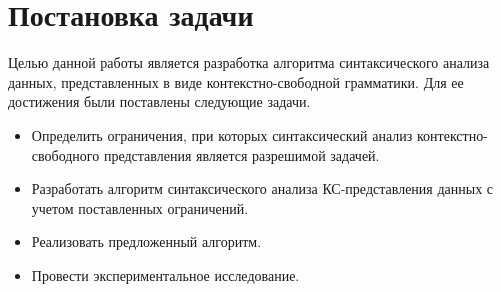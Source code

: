 \section{Постановка задачи}
Целью данной работы является разработка алгоритма синтаксического анализа данных, представленных в виде контекстно-свободной грамматики. Для ее достижения были поставлены следующие задачи.
\begin{itemize}
	\item Определить ограничения, при которых синтаксический анализ контекстно-свободного представления является разрешимой задачей.
	\item Разработать алгоритм синтаксического анализа КС-представления данных с учетом поставленных ограничений.
	\item Реализовать предложенный алгоритм.
	\item Провести экспериментальное исследование.
\end{itemize}
